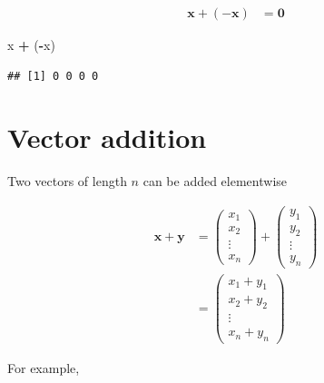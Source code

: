 \documentclass[
]{book}
\newenvironment{Shaded}{\begin{snugshade}}{\end{snugshade}}
\newcommand{\NormalTok}[1]{#1}
\newcommand{\OperatorTok}[1]{\textcolor[rgb]{0.81,0.36,0.00}{\textbf{#1}}}
\newcommand{\StringTok}[1]{\textcolor[rgb]{0.31,0.60,0.02}{#1}}
\theoremstyle{definition}
\theoremstyle{definition}
\theoremstyle{definition}
\theoremstyle{remark}
\begin{document}
\[
\begin{aligned}
\mathbf{x} + (- \mathbf{x}) & = \mathbf{0}
\end{aligned}
\]

\begin{Shaded}
\begin{Highlighting}[]
\NormalTok{x }\OperatorTok{+}\StringTok{ }\NormalTok{(}\OperatorTok{-}\NormalTok{x)}
\end{Highlighting}
\end{Shaded}

\begin{verbatim}
## [1] 0 0 0 0
\end{verbatim}

\hypertarget{vector-addition}{%
\section{Vector addition}\label{vector-addition}}

Two vectors of length \(n\) can be added elementwise

\[
\begin{aligned}
\mathbf{x} + \mathbf{y} & = \begin{pmatrix} x_1 \\ x_2 \\ \vdots \\ x_n \end{pmatrix} + \begin{pmatrix} y_1 \\ y_2 \\ \vdots \\ y_n \end{pmatrix} \\
& = \begin{pmatrix} x_1 + y_1 \\ x_2 + y_2 \\ \vdots \\ x_n + y_n \end{pmatrix} 
\end{aligned}
\]

For example,
\end{document}
